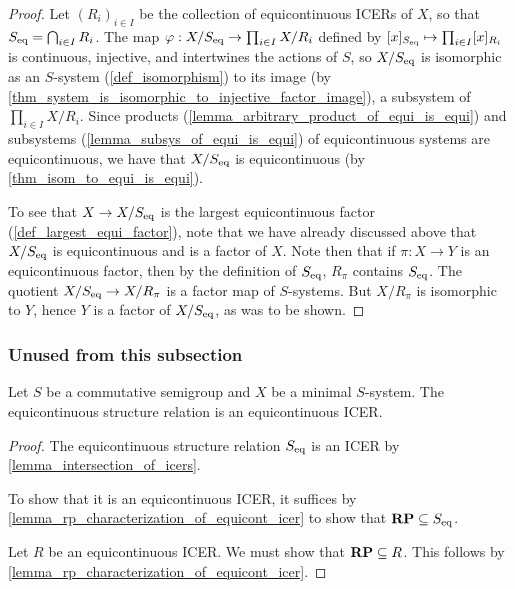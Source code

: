 \begin{proof}
    Let $(R_i)_{i \in I}$ be the collection of equicontinuous ICERs of $X$, so that $S_\text{eq} = \bigcap_{i \in I} R_i$.  The map
    $\varphi: X / S_\text{eq} \to \prod_{i \in I} X/R_i$ defined by $[x]_{S_\text{eq}} \mapsto \prod_{i \in I} [x]_{R_i}$ is continuous, injective, and intertwines the actions of $S$, so $X/S_\text{eq}$ is isomorphic as an $S$-system (\cref{def_isomorphism}) to its image (by \cref{thm_system_is_isomorphic_to_injective_factor_image}), a subsystem of $\prod_{i \in I} X/R_i$.  Since products (\cref{lemma_arbitrary_product_of_equi_is_equi}) and subsystems (\cref{lemma_subsys_of_equi_is_equi}) of equicontinuous systems are equicontinuous, we have that $X / S_\text{eq}$ is equicontinuous (by \cref{thm_isom_to_equi_is_equi}).

    To see that $X \to X / S_\text{eq}$ is the largest equicontinuous factor (\cref{def_largest_equi_factor}), note that we have already discussed above that $X / S_\text{eq}$ is equicontinuous and is a factor of $X$.  Note then that if $\pi : X \to Y$ is an equicontinuous factor, then by the definition of $S_\text{eq}$, $R_\pi$ contains $S_\text{eq}$.  The quotient $X / S_\text{eq} \to X / R_\pi$ is a factor map of $S$-systems.  But $X / R_\pi$ is isomorphic to $Y$, hence $Y$ is a factor of $X/S_\text{eq}$, as was to be shown.
\end{proof}

\subsubsection{Unused from this subsection}

\begin{theorem}
\label{thm_equi_structure_relation_is_equi_ICER}
\leanok{}
    Let $S$ be a commutative semigroup and $X$ be a minimal $S$-system.  The equicontinuous structure relation is an equicontinuous ICER.
\end{theorem}

\begin{proof}
\leanok{}
    The equicontinuous structure relation $S_\text{eq}$ is an ICER by \cref{lemma_intersection_of_icers}.

    To show that it is an equicontinuous ICER, it suffices by \cref{lemma_rp_characterization_of_equicont_icer} to show that $\mathbf{RP} \subseteq S_\text{eq}$.
    
    Let $R$ be an equicontinuous ICER.  We must show that $\mathbf{RP} \subseteq R$.  This follows by \cref{lemma_rp_characterization_of_equicont_icer}.
\end{proof}

